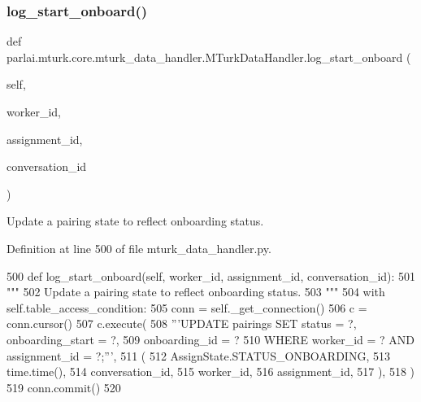 \subsubsection{\texorpdfstring{log\+\_\+start\+\_\+onboard()}{log\_start\_onboard()}}
{\footnotesize\ttfamily def parlai.\+mturk.\+core.\+mturk\+\_\+data\+\_\+handler.\+M\+Turk\+Data\+Handler.\+log\+\_\+start\+\_\+onboard (\begin{DoxyParamCaption}\item[{}]{self,  }\item[{}]{worker\+\_\+id,  }\item[{}]{assignment\+\_\+id,  }\item[{}]{conversation\+\_\+id }\end{DoxyParamCaption})}

\begin{DoxyVerb}Update a pairing state to reflect onboarding status.
\end{DoxyVerb}
 

Definition at line 500 of file mturk\+\_\+data\+\_\+handler.\+py.


\begin{DoxyCode}
500     \textcolor{keyword}{def }log\_start\_onboard(self, worker\_id, assignment\_id, conversation\_id):
501         \textcolor{stringliteral}{"""}
502 \textcolor{stringliteral}{        Update a pairing state to reflect onboarding status.}
503 \textcolor{stringliteral}{        """}
504         with self.table\_access\_condition:
505             conn = self.\_get\_connection()
506             c = conn.cursor()
507             c.execute(
508                 \textcolor{stringliteral}{'''UPDATE pairings SET status = ?, onboarding\_start = ?,}
509 \textcolor{stringliteral}{                         onboarding\_id = ?}
510 \textcolor{stringliteral}{                         WHERE worker\_id = ? AND assignment\_id = ?;'''},
511                 (
512                     AssignState.STATUS\_ONBOARDING,
513                     time.time(),
514                     conversation\_id,
515                     worker\_id,
516                     assignment\_id,
517                 ),
518             )
519             conn.commit()
520 
\end{DoxyCode}
\mbox{\label{classparlai_1_1mturk_1_1core_1_1mturk__data__handler_1_1MTurkDataHandler_a373fe84924d3235c1b461f679c9a0926}} 
